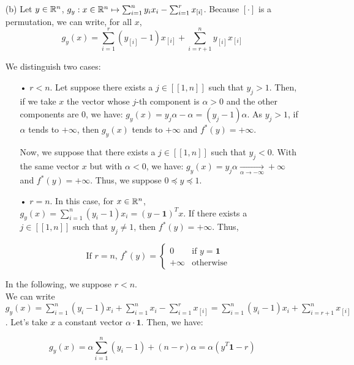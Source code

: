 \documentclass[a4paper, 11pt]{report}
\begin{document}
\begin{itemize}
    \item[(b)] Let $y \in \mathbb{R}^{n}$, $g_{y}: x \in \mathbb{R}^{n} \mapsto \sum_{i=1}^{n} y_{i} x_{i} - \sum_{i=1}^{r} x_{[i]}$. Because $[\cdot]$ is a permutation, we can write, for all $x$, 
    \[ g_{y}(x) = \sum_{i=1}^{r} (y_{[i]} - 1) x_{[i]} + \sum_{i=r+1}^{n} y_{[i]} x_{[i]} \]
    
    We distinguish two cases:
    
    \begin{itemize}
        \item[•] $r < n$. Let suppose there exists a $j \in [\![ 1, n ]\!]$ such that $y_{j} > 1$. Then, if we take $x$ the vector whose $j$-th component is $\alpha > 0$ and the other components are $0$, we have: $g_{y}(x) = y_{j} \alpha - \alpha = \left( y_{j} - 1 \right) \alpha$. As $y_{j} > 1$, if $\alpha$ tends to $+ \infty$, then $g_{y}(x)$ tends to $+ \infty$ and $f^{*}(y) = + \infty$.
        
        Now, we suppose that there exists a $j \in [\![ 1, n ]\!]$ such that $y_{j} < 0$. With the same vector $x$ but with $\alpha < 0$, we have: $g_{y}(x) = y_{j} \alpha \underset{\alpha \rightarrow - \infty}{\longrightarrow} + \infty$ and $f^{*}(y) = + \infty$. Thus, we suppose $0 \preceq y \preceq 1$.
        
        \item[•] $r = n$. In this case, for $x \in \mathbb{R}^{n}$, $g_{y}(x) = \sum_{i=1}^{n} \left( y_{i} - 1 \right) x_{i} = \left( y - \mathbf{1} \right)^{T} x$. If there exists a $j \in [\![ 1, n ]\!]$ such that $y_{j} \neq 1$, then $f^{*}(y) = + \infty$. Thus,
        
        \[ \boxed{\text{If $r = n$, } f^{*}(y) = \begin{cases}
        0        & \text{if } y = \mathbf{1} \\
        + \infty & \text{otherwise }
        \end{cases}} \]
    \end{itemize}
    
    In the following, we suppose $r < n$. \\
    We can write $g_{y}(x) = \sum_{i=1}^{n} \left( y_{i} - 1 \right) x_{i} + \sum_{i=1}^{n} x_{i} - \sum_{i=1}^{r} x_{[i]} = \sum_{i=1}^{n} \left( y_{i} - 1 \right) x_{i} + \sum_{i=r+1}^{n} x_{[i]}$. Let's take $x$ a constant vector $\alpha \cdot \mathbf{1}$. Then, we have:
    
    \[ g_{y}(x) = \alpha \sum_{i=1}^{n} \left( y_{i} - 1 \right) + \left( n - r \right) \alpha = \alpha \left( y^{T}\mathbf{1} - r \right) \]
    

\end{itemize}
\end{document}
